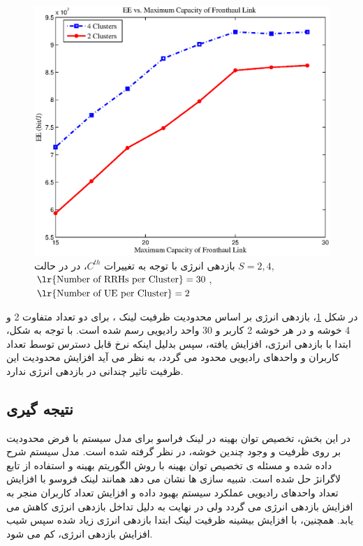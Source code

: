 \begin{figure}[H]
  \centering
    \includegraphics[width=\linewidth]{./fig3/cap}
  \caption{  بازدهی انرژی با توجه به تغییرات $C^{th}$، در در حالت $S =2 ,4 $, $\text{\lr{Number of RRHs per Cluster}} = 30$, $\text{\lr{Number of UE per Cluster}} =2$ }
  \label{fig:cap}
\end{figure}

در شکل \ref{fig:cap}، بازدهی انرژی بر اساس محدودیت ظرفیت لینک ، برای دو تعداد متفاوت  2 و 4 خوشه و در هر خوشه 2 کاربر و 30 واحد رادیویی رسم شده است. با توجه به شکل، ابتدا با بازدهی انرژی، افزایش یافته،
سپس بدلیل اینکه نرخ قابل دسترس توسط تعداد کاربران و واحدهای رادیویی محدود می گردد، به نظر می آید افزایش محدودیت این ظرفیت تاثیر چندانی در بازدهی انرژی ندارد.  
\subsection{نتیجه گیری}
در این بخش، تخصیص توان بهینه در لینک فراسو برای مدل سیستم  با فرض محدودیت بر روی ظرفیت  و وجود چندین خوشه، در نظر گرفته شده است. مدل سیستم  شرح داده شده و مسئله ی تخصیص توان بهینه با روش الگوریتم بهینه و استفاده از تابع لاگرانژ حل شده است. شبیه سازی ها نشان می دهد همانند لینک فروسو با افزایش تعداد واحدهای رادیویی عملکرد سیستم بهبود داده و افزایش تعداد کاربران منجر به افزایش بازدهی انرژی می گردد ولی در نهایت به دلیل تداخل بازدهی انرژی کاهش می یابد. همچنین، با افزایش  بیشینه ظرفیت لینک  ابتدا بازدهی انرژی زیاد شده سپس شیب افزایش بازدهی انرژی، کم می شود.
